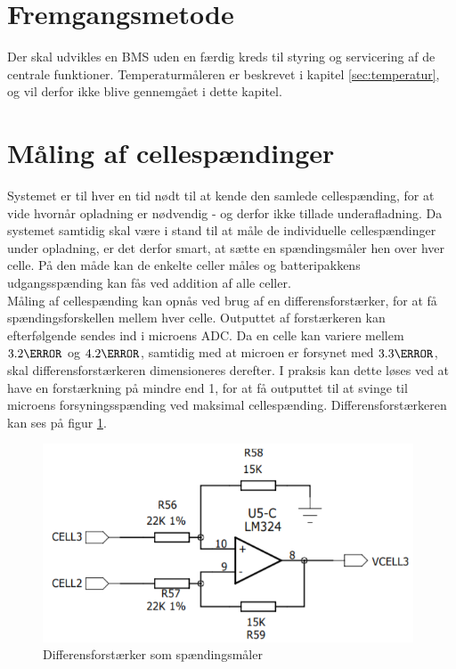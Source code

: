 \section{Fremgangsmetode}
Der skal udvikles en BMS uden en færdig kreds til styring og servicering af de centrale funktioner. Temperaturmåleren er beskrevet i kapitel \ref{sec:temperatur}, og vil derfor ikke blive gennemgået i dette kapitel.

\section{Måling af cellespændinger} \label{sec:cell_voltage}
Systemet er til hver en tid nødt til at kende den samlede cellespænding, for at vide hvornår opladning er nødvendig - og derfor ikke tillade underafladning. Da systemet samtidig skal være i stand til at måle de individuelle cellespændinger under opladning, er det derfor smart, at sætte en spændingsmåler hen over hver celle. På den måde kan de enkelte celler måles og batteripakkens udgangsspænding kan fås ved addition af alle celler.
\\

Måling af cellespænding kan opnås ved brug af en differensforstærker, for at få spændingsforskellen mellem hver celle. Outputtet af forstærkeren kan efterfølgende sendes ind i microens ADC. Da en celle kan variere mellem $3.2\volt$ og $4.2\volt$, samtidig med at microen er forsynet med $3.3\volt$, skal differensforstærkeren dimensioneres derefter. I praksis kan dette løses ved at have en forstærkning på mindre end 1, for at få outputtet til at svinge til microens forsyningsspænding ved maksimal cellespænding. Differensforstærkeren kan ses på figur \ref{fig:cell_voltage}.
\\

\begin{figure}[h]
	\centering
	\includegraphics[width=11cm]{billeder/cell_voltage.png}
	\caption{Differensforstærker som spændingsmåler}
	\label{fig:cell_voltage}
\end{figure}

